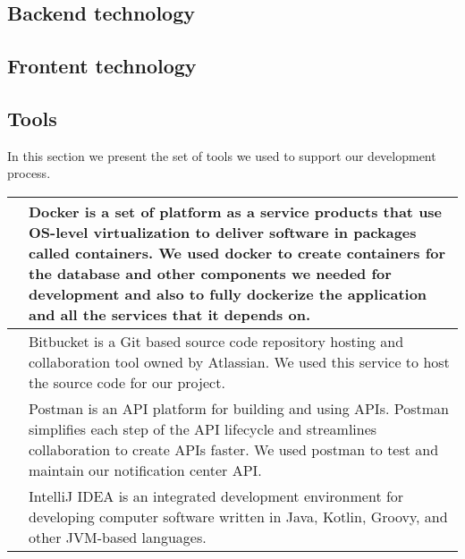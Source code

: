 \subsection{Backend technology}
\subsection{Frontent technology}

\subsection{Tools}
In this section we present the set of tools we used to support our development process.

\begin{table}[hbt!]
      \begin{tabular}{ | m{} | m{} | }
            \hline
            \centering    & Docker is a set of platform as a service products that use OS-level virtualization to deliver software in packages called containers. We used docker to create containers for the database and other components we needed for development and also to fully dockerize the application and all the services that it depends on. \\
            \hline
            \centering & Bitbucket is a Git based source code repository hosting and collaboration tool owned by Atlassian. We used this service to host the source code for our project.                                                                                                                                                               \\
            \hline
            \centering   & Postman is an API platform for building and using APIs. Postman simplifies each step of the API lifecycle and streamlines collaboration to create APIs faster. We used postman to test and maintain our notification center API.                                                                                               \\
            \hline
            \centering  & IntelliJ IDEA is an integrated development environment for developing computer software written in Java, Kotlin, Groovy, and other JVM-based languages.                                                                                                                                                                        \\

\end{tabular}
\end{table}
